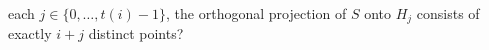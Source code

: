 \documentclass{patmorin}
\begin{document}
each
$j\in\{0,\ldots,t(i)-1\}$, the orthogonal projection of $S$ onto $H_j$
consists of exactly $i+j$ distinct points?



\end{document}
